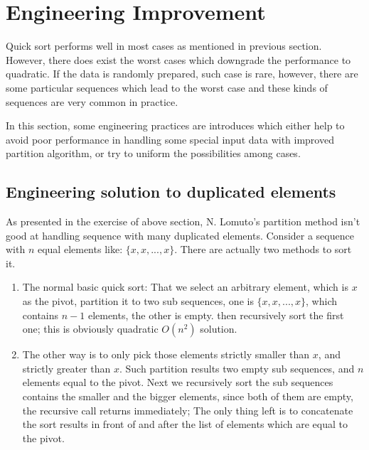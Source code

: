 \documentclass[UTF8]{article}
\begin{document}

\section{Engineering Improvement}

Quick sort performs well in most cases as mentioned in previous section. However, there
does exist the worst cases which downgrade the performance to quadratic. If the data is randomly
prepared, such case is rare, however, there are some particular sequences which lead to
the worst case and these kinds of sequences are very common in practice.

In this section, some engineering practices are introduces which either help to avoid poor performance
in handling some special input data with improved partition algorithm, or try to uniform
the possibilities among cases.

\subsection{Engineering solution to duplicated elements}
As presented in the exercise of above section, N. Lomuto's partition method isn't good at handling
sequence with many duplicated elements. Consider a sequence with $n$ equal elements like: $\{x, x, ..., x\}$.
There are actually two methods to sort it.

\begin{enumerate}
\item The normal basic quick sort: That we select an arbitrary element, which is $x$ as the pivot, partition
it to two sub sequences, one is $\{x, x, ..., x \}$, which contains $n-1$ elements, the other is empty.
then recursively sort the first one; this is obviously quadratic $O(n^2)$ solution.
\item The other way is to only pick those elements strictly smaller than $x$, and strictly greater than $x$.
Such partition results two empty sub sequences, and $n$ elements equal to the pivot.
Next we recursively sort the sub sequences contains the smaller and the bigger elements, since both of them are empty, the recursive call returns immediately;
The only thing left is to concatenate the sort results in front of and after the list of elements which are equal to the
pivot.
\end{enumerate}
\end{document}
